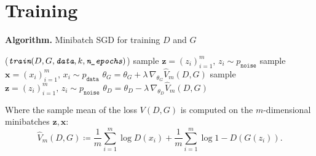 \documentclass{beamer}
\begin{document}
	
	\section{Training}

	\begin{frame}
		\setlength{\algomargin}{2em}
		\begin{algorithm}[H]
			\caption{\vspace{-0.07cm}\textbf{Algorithm.} Minibatch SGD for training $D$ and $G$}
			\DontPrintSemicolon
			\Function($\textit{\texttt{train}}{(D, G, \textit{\texttt{data}}, k, \textit{\texttt{n\_epochs}})}$){
				{
					{
						sample $\mathbf{z} = (z_i)_{i = 1}^{m}, \, z_i \sim p_{\texttt{noise}}$ \;
						sample $\mathbf{x} = (x_i)_{i = 1}^{m}, \, x_i \sim p_{\texttt{data}}$ \;
						$\theta_G = \theta_G + \lambda \, \nabla_{\theta_G} \widehat{V}_m(D, G)$ \;
					}
				sample $\mathbf{z} = (z_i)_{i = 1}^{m}, \, z_i \sim p_{\texttt{noise}}$ \;
				$\theta_D = \theta_D - \lambda \, \nabla_{\theta_D} \widehat{V}_m(D, G)$ \;
				}
			}
		\end{algorithm}
		\medskip 
		Where the sample mean of the loss $V(D, G)$ is computed on the $m$-dimensional minibatches $\mathbf{z}, \mathbf{x}$:
		\vspace{-0.2cm}
		\begin{equation*}
			\widehat{V}_m(D, G) \coloneqq \frac{1}{m} \sum_{i = 1}^{m} \log{D(x_i)} + \frac{1}{m} \sum_{i = 1}^{m} \log{1 - D(G(z_i))}.
		\end{equation*}
	\end{frame}
\end{document}
